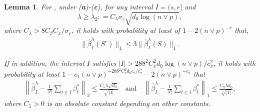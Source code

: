 \documentclass[twoside]{article}
\newtheorem{lemma}[theorem]{Lemma}
\begin{document}
\begin{lemma} \label{lemma:oracle 2}
For , under (\textbf{a})-(\textbf{c}), for any interval $I = (s, e]$ and
	\[
		\lambda \geq \lambda_2 : = C_{\lambda}\sigma_{\varepsilon} \sqrt{d_0 \log(n \vee p)}, 
	\] 
	where $C_{\lambda} > 8C_{\beta}C_x/\sigma_{\varepsilon}$, it holds with probability at least of $1 - 2(n \vee p)^{-c}$ that,
	\begin{align*}	
		\| \widehat \beta^\lambda_{I} (S^c)\|_1 \le 3 \| \widehat \beta^\lambda_{I} (S )\|_1.
	\end{align*}

If in addition, the interval $I$ satisfies $|I| > 288^2 C^2_x d_0 \log(n \vee p)/c_x^2$, it holds with probability at least $1 - c_1 (n \vee p)^{-288^2C_x^2d_0c_2/c_x^2} - 2(n \vee p)^{-c_3}$ that
	\begin{align*}
		\left \|\widehat\beta_{I}^ \lambda - \frac{1}{|I|} \sum_{t \in I} \beta_t^* \right\|_2 \leq  \frac{C_5 \lambda \sqrt{d_0}}{\sqrt{|I|}} \quad \mbox{and} \quad \left \|  \widehat\beta_{I}^ \lambda - \frac{1}{|I|} \sum_{t \in I} \beta_t^* \right\|_1 \le  \frac{C_5 \lambda d_0}{\sqrt{|I|}},
	\end{align*}
	where $C_5 > 0$ is an absolute constant depending on other constants.
\end{lemma}
 
\end{document}
